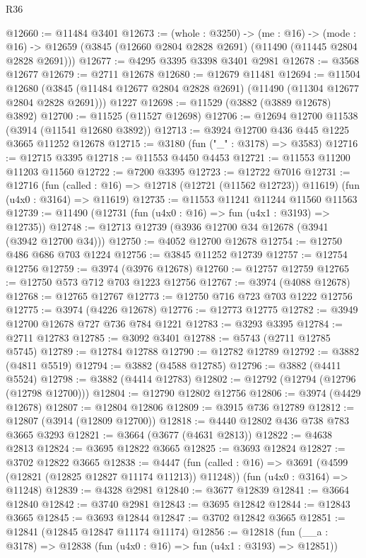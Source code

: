 \begin{lexlean}{R36}
\begin{coremodule}
@12660 := @11484 @3401
@12673 := (whole : @3250) ->
  (me : @16) ->
  (mode : @16) -> @12659 (@3845 (@12660 @2804 @2828 @2691) (@11490 (@11445 @2804 @2828 @2691)))
@12677 := @4295 @3395 @3398 @3401 @2981
@12678 := @3568 @12677
@12679 := @2711 @12678
@12680 := @12679 @11481
@12694 := @11504
    @12680
    (@3845 (@11484 @12677 @2804 @2828 @2691) (@11490 (@11304 @12677 @2804 @2828 @2691)))
    @1227
@12698 := @11529 (@3882 (@3889 @12678) @3892)
@12700 := @11525 (@11527 @12698)
@12706 := @12694 @12700 @11538 (@3914 (@11541 @12680 @3892))
@12713 := @3924 @12700 @436 @445 @1225 @3665 @11252 @12678
@12715 := @3180 (fun ("_" : @3178) => @3583)
@12716 := @12715 @3395
@12718 := @11553 @4450 @4453
@12721 := @11553 @11200 @11203 @11560
@12722 := @7200 @3395
@12723 := @12722 @7016
@12731 := @12716
    (fun (called : @16) => @12718 (@12721 (@11562 @12723)) @11619)
    (fun (u4x0 : @3164) => @11619)
@12735 := @11553 @11241 @11244 @11560 @11563
@12739 := @11490 (@12731 (fun (u4x0 : @16) => fun (u4x1 : @3193) => @12735))
@12748 := @12713 @12739 (@3936 @12700 @34 @12678 (@3941 (@3942 @12700 @34)))
@12750 := @4052 @12700 @12678
@12754 := @12750 @486 @686 @703 @1224
@12756 := @3845 @11252 @12739
@12757 := @12754 @12756
@12759 := @3974 (@3976 @12678)
@12760 := @12757 @12759
@12765 := @12750 @573 @712 @703 @1223 @12756
@12767 := @3974 (@4088 @12678)
@12768 := @12765 @12767
@12773 := @12750 @716 @723 @703 @1222 @12756
@12775 := @3974 (@4226 @12678)
@12776 := @12773 @12775
@12782 := @3949 @12700 @12678 @727 @736 @784 @1221
@12783 := @3293 @3395
@12784 := @2711 @12783
@12785 := @3092 @3401
@12788 := @5743 (@2711 @12785 @5745)
@12789 := @12784 @12788
@12790 := @12782 @12789
@12792 := @3882 (@4811 @5519)
@12794 := @3882 (@4588 @12785)
@12796 := @3882 (@4411 @5524)
@12798 := @3882 (@4414 @12783)
@12802 := @12792 (@12794 (@12796 (@12798 @12700)))
@12804 := @12790 @12802 @12756
@12806 := @3974 (@4429 @12678)
@12807 := @12804 @12806
@12809 := @3915 @736 @12789
@12812 := @12807 (@3914 (@12809 @12700))
@12818 := @4440 @12802 @436 @738 @783 @3665 @3293
@12821 := @3664 (@3677 (@4631 @2813))
@12822 := @4638 @2813
@12824 := @3695 @12822 @3665
@12825 := @3693 @12824
@12827 := @3702 @12822 @3665
@12838 := @4447
    (fun (called : @16) => @3691 (@4599 (@12821 (@12825 @12827 @11174 @11213)) @11248))
    (fun (u4x0 : @3164) => @11248)
@12839 := @4328 @2981
@12840 := @3677 @12839
@12841 := @3664 @12840
@12842 := @3740 @2981
@12843 := @3695 @12842
@12844 := @12843 @3665
@12845 := @3693 @12844
@12847 := @3702 @12842 @3665
@12851 := @12841 (@12845 @12847 @11174 @11174)
@12856 := @12818 (fun (__a : @3178) => @12838 (fun (u4x0 : @16) => fun (u4x1 : @3193) => @12851))

\end{coremodule}
\end{lexlean}

